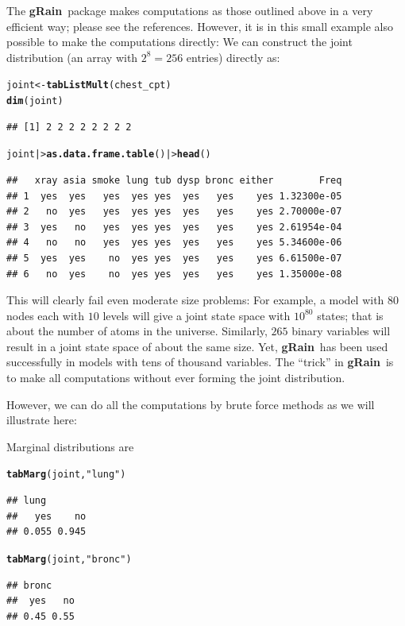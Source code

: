 \documentclass[10pt]{article}\usepackage[]{graphicx}\usepackage[]{xcolor}
\makeatletter
\newcommand{\hlstr}[1]{\textcolor[rgb]{0.192,0.494,0.8}{#1}}%
\newcommand{\hlstd}[1]{\textcolor[rgb]{0.345,0.345,0.345}{#1}}%
\newcommand{\hlkwb}[1]{\textcolor[rgb]{0.69,0.353,0.396}{#1}}%
\newcommand{\hlkwd}[1]{\textcolor[rgb]{0.737,0.353,0.396}{\textbf{#1}}}%
\newenvironment{kframe}{%
 \def\at@end@of@kframe{}%
 \ifinner\ifhmode%
  \def\at@end@of@kframe{\end{minipage}}%
  \begin{minipage}{\columnwidth}%
 \fi\fi%
 \def\FrameCommand##1{\hskip\@totalleftmargin \hskip-\fboxsep
 \colorbox{shadecolor}{##1}\hskip-\fboxsep
     \hskip-\linewidth \hskip-\@totalleftmargin \hskip\columnwidth}%
 \MakeFramed {\advance\hsize-\width
   \@totalleftmargin\z@ \linewidth\hsize
   \@setminipage}}%
 {\par\unskip\endMakeFramed%
 \at@end@of@kframe}
\newenvironment{knitrout}{}{} %
\def\grbn{{\bf gRain}}
\makeatother
\begin{document}
The \grbn\ package makes computations as those outlined above in a
very efficient way; please see the references.  However, it is in this
small example also possible to make the computations directly: We can
construct the joint distribution (an array with $2^8=256$ entries) directly as:
\begin{knitrout}
\color{fgcolor}\begin{kframe}
\begin{alltt}
\hlstd{joint} \hlkwb{<-} \hlkwd{tabListMult}\hlstd{(chest_cpt)}
\hlkwd{dim}\hlstd{(joint)}
\end{alltt}
\begin{verbatim}
## [1] 2 2 2 2 2 2 2 2
\end{verbatim}
\begin{alltt}
\hlstd{joint  |>} \hlkwd{as.data.frame.table}\hlstd{() |>} \hlkwd{head}\hlstd{()}
\end{alltt}
\begin{verbatim}
##   xray asia smoke lung tub dysp bronc either        Freq
## 1  yes  yes   yes  yes yes  yes   yes    yes 1.32300e-05
## 2   no  yes   yes  yes yes  yes   yes    yes 2.70000e-07
## 3  yes   no   yes  yes yes  yes   yes    yes 2.61954e-04
## 4   no   no   yes  yes yes  yes   yes    yes 5.34600e-06
## 5  yes  yes    no  yes yes  yes   yes    yes 6.61500e-07
## 6   no  yes    no  yes yes  yes   yes    yes 1.35000e-08
\end{verbatim}
\end{kframe}
\end{knitrout}

This will clearly fail even moderate size problems: For example, a
model with $80$
nodes each with $10$
levels will give a joint state space with $10^{80}$
states; that is about the number of atoms in the universe. Similarly,
$265$
binary variables will result in a joint state space of about the same
size. Yet, \grbn\ has been used successfully
in models with tens of
thousand variables.  The ``trick'' in \grbn\ is to make all
computations without ever forming the joint distribution. 

However, we
can do all the computations by brute force methods as we will
illustrate here:

Marginal distributions are
\begin{knitrout}
\color{fgcolor}\begin{kframe}
\begin{alltt}
\hlkwd{tabMarg}\hlstd{(joint,} \hlstr{"lung"}\hlstd{)}
\end{alltt}
\begin{verbatim}
## lung
##   yes    no 
## 0.055 0.945
\end{verbatim}
\begin{alltt}
\hlkwd{tabMarg}\hlstd{(joint,} \hlstr{"bronc"}\hlstd{)}
\end{alltt}
\begin{verbatim}
## bronc
##  yes   no 
## 0.45 0.55
\end{verbatim}
\end{kframe}
\end{knitrout}
\end{document}
